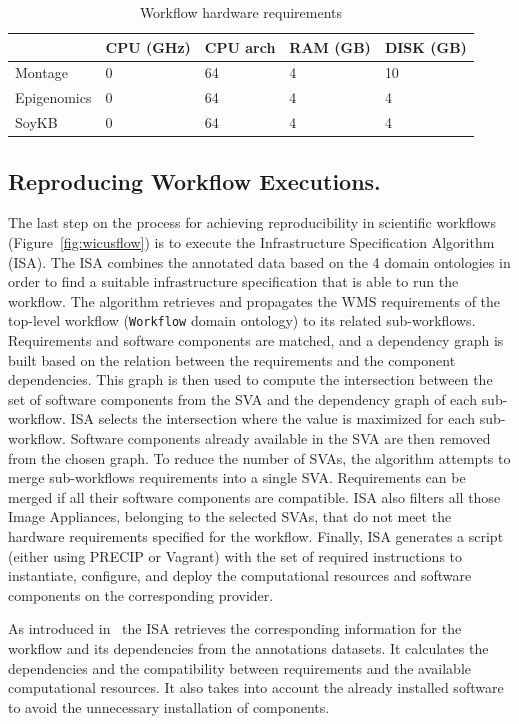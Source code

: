 \begin{table}[h]
\begin{tabular}{l|llll}
\multicolumn{1}{c|}{} 
 & CPU (GHz) & CPU arch & RAM (GB) & DISK (GB) \\ \hline
Montage &  0 &  64 & 4 & 10 \\ \hline
Epigenomics &  0 &  64 &  4 & 4  \\ \hline
SoyKB & 0  & 64 & 4 & 4  \\ \hline
\end{tabular}
\caption{Workflow hardware requirements}
\label{tab:hwreqs}
\end{table}

\subsection{Reproducing Workflow Executions.}

The last step on the process for achieving reproducibility in scientific workflows (Figure~\ref{fig:wicusflow}) is to execute the Infrastructure Specification Algorithm (ISA). The ISA combines the annotated data based on the 4 domain ontologies in order to find a suitable infrastructure specification that is able to run the workflow. The algorithm retrieves and propagates the WMS requirements of the top-level workflow (\texttt{Workflow} domain ontology) to its related sub-workflows. Requirements and software components are matched, and a dependency graph is built based on the relation between the requirements and the component dependencies. This graph is then used to compute the intersection between the set of software components from the SVA and the dependency graph of each sub-workflow. ISA selects the intersection where the value is maximized for each sub-workflow. Software components already available in the SVA are then removed from the chosen graph. To reduce the number of SVAs, the algorithm attempts to merge sub-workflows requirements into a single SVA. Requirements can be merged if all their software components are compatible. ISA also filters all those Image Appliances, belonging to the selected SVAs, that do not meet the hardware requirements specified for the workflow. Finally, ISA generates a script (either using PRECIP or Vagrant) with the set of required instructions to instantiate, configure, and deploy the computational resources and software components on the corresponding provider.

As introduced in~\cite{wicus} the ISA retrieves the corresponding information for the workflow and its dependencies from the annotations datasets. It calculates the dependencies and the compatibility between requirements and the available computational resources. It also takes into account the already installed software to avoid the unnecessary installation of components.

